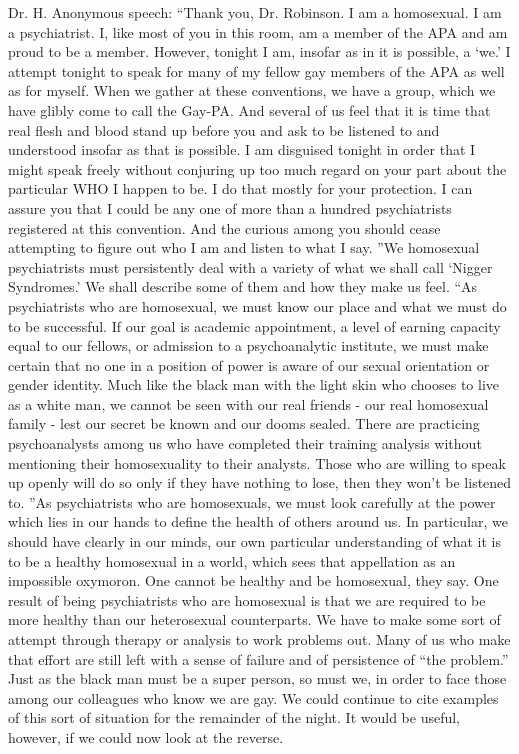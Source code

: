Dr. H. Anonymous speech:
``Thank you, Dr. Robinson. I am a homosexual. I am a psychiatrist. I, like most of you in this room, am a member of the APA and am proud to be a member. However, tonight I am, insofar as in it is possible, a ‘we.’ I attempt tonight to speak for many of my fellow gay members of the APA as well as for myself. When we gather at these conventions, we have a group, which we have glibly come to call the Gay-PA. And several of us feel that it is time that real flesh and blood stand up before you and ask to be listened to and understood insofar as that is possible. I am disguised tonight in order that I might speak freely without conjuring up too much regard on your part about the particular WHO I happen to be. I do that mostly for your protection. I can assure you that I could be any one of more than a hundred psychiatrists registered at this convention. And the curious among you should cease attempting to figure out who I am and listen to what I say.
''We homosexual psychiatrists must persistently deal with a variety of what we shall call ‘Nigger Syndromes.’ We shall describe some of them and how they make us feel.
``As psychiatrists who are homosexual, we must know our place and what we must do to be successful. If our goal is academic appointment, a level of earning capacity equal to our fellows, or admission to a psychoanalytic institute, we must make certain that no one in a position of power is aware of our sexual orientation or gender identity. Much like the black man with the light skin who chooses to live as a white man, we cannot be seen with our real friends - our real homosexual family - lest our secret be known and our dooms sealed. There are practicing psychoanalysts among us who have completed their training analysis without mentioning their homosexuality to their analysts. Those who are willing to speak up openly will do so only if they have nothing to lose, then they won’t be listened to.
''As psychiatrists who are homosexuals, we must look carefully at the power which lies in our hands to define the health of others around us. In particular, we should have clearly in our minds, our own particular understanding of what it is to be a healthy homosexual in a world, which sees that appellation as an impossible oxymoron. One cannot be healthy and be homosexual, they say. One result of being psychiatrists who are homosexual is that we are required to be more healthy than our heterosexual counterparts. We have to make some sort of attempt through therapy or analysis to work problems out. Many of us who make that effort are still left with a sense of failure and of persistence of ``the problem.'' Just as the black man must be a super person, so must we, in order to face those among our colleagues who know we are gay. We could continue to cite examples of this sort of situation for the remainder of the night. It would be useful, however, if we could now look at the reverse.
